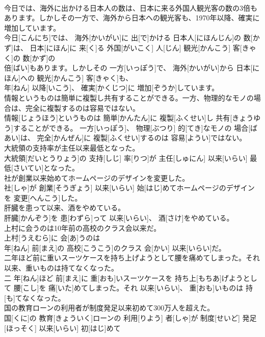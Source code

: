 \documentclass[8pt]{extreport}
\begin{document}
\begin{CJK}{UTF8}{min}
\\	今日では、海外に出かける日本人の数は、日本に来る外国人観光客の数の3倍もあります。しかしその一方で、海外から日本への観光客も、1970年以降、確実に増加しています。	
\\	今日[こんにち]では、 海外[かいがい]に 出[で]かける 日本人[にほんじん]の 数[かず]は、 日本[にほん]に 来[く]る 外国[がいこく] 人[じん] 観光[かんこう] 客[きゃく]の 数[かず]の 
\\	倍[ばい]もあります。しかしその 一方[いっぽう]で、 海外[かいがい]から 日本[にほん]への 観光[かんこう] 客[きゃく]も、 
\\	年[ねん] 以降[いこう]、 確実[かくじつ]に 増加[ぞうか]しています。
\\	情報というものは簡単に複製し共有することができる。一方、物理的なモノの場合は、完全に複製するのは容易ではない。	
\\	情報[じょうほう]というものは 簡単[かんたん]に 複製[ふくせい]し 共有[きょうゆう]することができる。 一方[いっぽう]、 物理[ぶつり] 的[てき]なモノの 場合[ばあい]は、 完全[かんぜん]に 複製[ふくせい]するのは 容易[ようい]ではない。
\\	大統領の支持率が主任以来最低となった。	
\\	大統領[だいとうりょう]の 支持[しじ] 率[りつ]が 主任[しゅにん] 以来[いらい] 最低[さいてい]となった。
\\	社が創業以来始めてホームページのデザインを変更した。	
\\	社[しゃ]が 創業[そうぎょう] 以来[いらい] 始[はじ]めてホームページのデザインを 変更[へんこう]した。
\\	肝臓を患って以来、酒をやめている。	
\\	肝臓[かんぞう]を 患[わずら]って 以来[いらい]、 酒[さけ]をやめている。
\\	上村に会うのは10年前の高校のクラス会以来だ。	
\\	上村[うえむら]に 会[あ]うのは 
\\	年[ねん] 前[まえ]の 高校[こうこう]のクラス 会[かい] 以来[いらい]だ。
\\	二年ほど前に重いスーツケースを持ち上げようとして腰を痛めてしまった。それ以来、重いものは持てなくなった。	
\\	二 年[ねん]ほど 前[まえ]に 重[おも]いスーツケースを 持ち上[もちあ]げようとして 腰[こし]を 痛[いた]めてしまった。それ 以来[いらい]、 重[おも]いものは 持[も]てなくなった。
\\	国の教育ローンの利用者が制度発足以来初めて300万人を超えた。	
\\	国[くに]の 教育[きょういく]ローンの 利用[りよう] 者[しゃ]が 制度[せいど] 発足[ほっそく] 以来[いらい] 初[はじ]めて 

\end{CJK}
\end{document}
